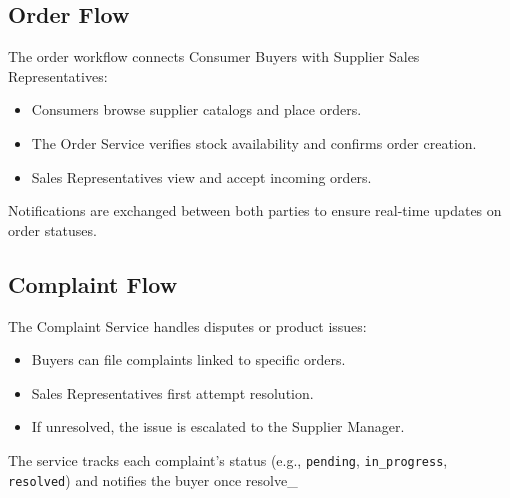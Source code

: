 \subsection{Order Flow}

The order workflow connects Consumer Buyers with Supplier Sales Representatives:
\begin{itemize}
    \item Consumers browse supplier catalogs and place orders.
    \item The Order Service verifies stock availability and confirms order creation.
    \item Sales Representatives view and accept incoming orders.
\end{itemize}
Notifications are exchanged between both parties to ensure real-time updates on order statuses.

\subsection{Complaint Flow}

The Complaint Service handles disputes or product issues:
\begin{itemize}
    \item Buyers can file complaints linked to specific orders.
    \item Sales Representatives first attempt resolution.
    \item If unresolved, the issue is escalated to the Supplier Manager.
\end{itemize}
The service tracks each complaint’s status (e.g., \texttt{pending}, \texttt{in\_progress}, \texttt{resolved}) and notifies the buyer once resolve_
